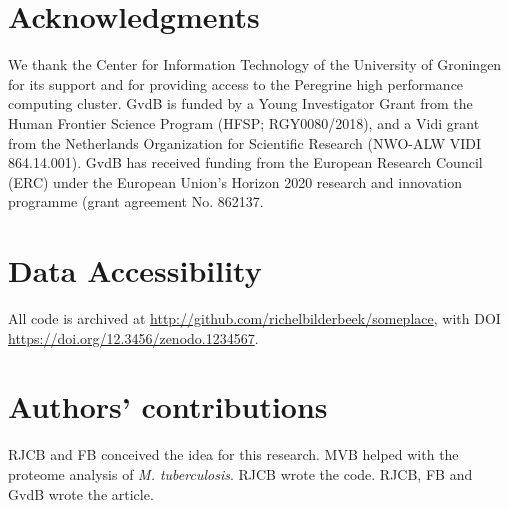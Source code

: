 \section{Acknowledgments}

We thank the Center for Information Technology of the University 
of Groningen for its support and for providing access to the Peregrine 
high performance computing cluster. GvdB is funded by a Young Investigator Grant from the Human Frontier Science Program (HFSP; RGY0080/2018), and a Vidi grant from the Netherlands Organization for Scientific Research (NWO-ALW VIDI 864.14.001). GvdB has received funding from the European Research Council (ERC) under the European Union’s Horizon 2020 research and innovation programme (grant agreement No. 862137. 

\section{Data Accessibility}

All code is archived at \url{http://github.com/richelbilderbeek/someplace},
with DOI \url{https://doi.org/12.3456/zenodo.1234567}.

\section{Authors' contributions}

RJCB and FB conceived the idea for this research. MVB helped with the proteome analysis of \emph{M. tuberculosis}.
RJCB wrote the code.
RJCB, FB and GvdB wrote the article.





\appendix
